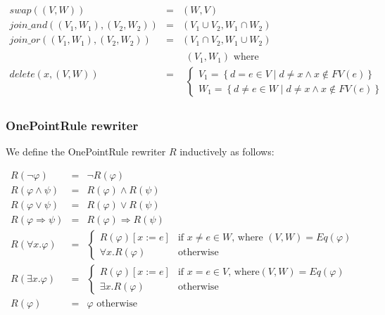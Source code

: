 \begin{equation*}
\begin{array}{lll}
swap\left( \left( V,W\right) \right) & = & \left( W,V\right) \\
join\_and\left( \left( V_{1},W_{1}\right) ,\left( V_{2},W_{2}\right) \right)
& = & \left( V_{1}\cup V_{2},W_{1}\cap W_{2}\right) \\
join\_or\left( \left( V_{1},W_{1}\right) ,\left( V_{2},W_{2}\right) \right)
& = & \left( V_{1}\cap V_{2},W_{1}\cup W_{2}\right) \\
delete\left( x,\left( V,W\right) \right) & = &
\begin{array}{l}
\left( V_{1},W_{1}\right) \text{ where} \\
\left\{
\begin{array}{c}
V_{1}=\left\{ d=e\in V\mid d\neq x\wedge x\notin FV(e)\right\} \\
W_{1}=\left\{ d\neq e\in W\mid d\neq x\wedge x\notin FV(e)\right\}%
\end{array}%
\right.%
\end{array}%
\end{array}%
\end{equation*}

\subsubsection{OnePointRule rewriter}

We define the OnePointRule rewriter $R$ inductively as follows:

\begin{equation*}
\begin{array}{lll}
R\left( \lnot \varphi \right) & = & \lnot R\left( \varphi \right) \\
R\left( \varphi \wedge \psi \right) & = & R\left( \varphi \right) \wedge
R\left( \psi \right) \\
R\left( \varphi \vee \psi \right) & = & R\left( \varphi \right) \vee R\left(
\psi \right) \\
R\left( \varphi \Rightarrow \psi \right) & = & R\left( \varphi \right)
\Rightarrow R\left( \psi \right) \\
R\left( \forall x.\varphi \right) & = & \left\{
\begin{array}{cc}
R\left( \varphi \right) \left[ x:=e\right] & \text{if }x\neq e\in W\text{,
where }\left( V,W\right) =Eq\left( \varphi \right) \\
\forall x.R\left( \varphi \right) & \text{otherwise}%
\end{array}%
\right. \\
R\left( \exists x.\varphi \right) & = & \left\{
\begin{array}{cc}
R\left( \varphi \right) \left[ x:=e\right] & \text{if }x=e\in V\text{, where
}\left( V,W\right) =Eq\left( \varphi \right) \\
\exists x.R\left( \varphi \right) & \text{otherwise}%
\end{array}%
\right. \\
R\left( \varphi \right) & = & \varphi \text{ otherwise}%
\end{array}%
\end{equation*}

